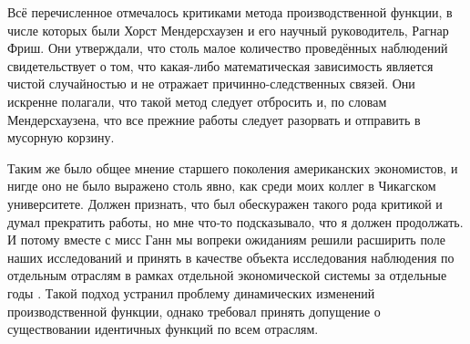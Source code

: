 \documentclass{article}
\begin{document}
Всё перечисленное отмечалось критиками метода производственной функции, в числе которых были Хорст Мендерсхаузен и его научный руководитель, Рагнар Фриш. Они утверждали, что столь малое количество проведённых наблюдений свидетельствует о том, что какая-либо математическая зависимость является чистой случайностью и не отражает причинно-следственных связей. Они искренне полагали, что такой метод следует отбросить и, по словам Мендерсхаузена, что все прежние работы следует разорвать и отправить в мусорную корзину.


Таким же было общее мнение старшего поколения американских экономистов, и нигде оно не было выражено столь явно, как среди моих коллег в Чикагском университете. Должен признать, что был обескуражен такого рода критикой и думал прекратить работы, но мне что-то подсказывало, что я должен продолжать. И потому вместе с мисс Ганн мы вопреки ожиданиям решили расширить поле наших исследований и принять в качестве объекта исследования наблюдения по отдельным отраслям в рамках отдельной экономической системы за отдельные годы \cite{Bronfenbrenner:1,Douglas:4,Douglas:5,Douglas:3}. Такой подход устранил проблему динамических изменений производственной функции, однако требовал принять допущение о существовании идентичных функций по всем отраслям.
\end{document}
